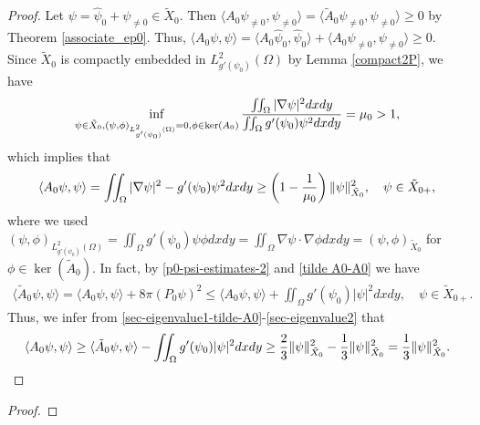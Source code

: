 \documentclass[1 [leqno, 11pt]{amsart}
\numberwithin{equation}{section}
\begin{document}
\begin{CJK*}{GBK}{song}
\begin{proof}
Let $\psi=\widehat\psi_0+\psi_{\neq0}\in \tilde X_0$. Then
$\langle A_0 \psi_{\neq0},\psi_{\neq0}\rangle =
\langle \tilde A_0 \psi_{\neq0},\psi_{\neq0}\rangle \geq 0$ by Theorem \ref{associate_ep0}.
Thus, $
\langle A_0\psi,\psi\rangle= \langle A_0\widehat\psi_0,\widehat\psi_0\rangle+\langle A_0\psi_{\neq0},\psi_{\neq0}\rangle\geq0$.
Since  $\tilde X_0$ is compactly embedded in $L^2_{g'(\psi_0)}(\Omega)$ by Lemma \ref{compact2P}, we have
\begin{align*}\inf_{\psi \in \tilde X_0, (\psi, \phi)_{L^2_{g'(\psi_0)}(\Omega)} = 0, \phi\in\ker(A_0)}{\iint_\Omega|\nabla\psi|^2dxdy\over\iint_\Omega g'(\psi_0)\psi^2dxdy}=\mu_0>1,
\end{align*}
which implies that
\begin{align*}
 \langle A_0\psi,\psi\rangle=\iint_\Omega|\nabla\psi|^2-g'(\psi_0)\psi^2dxdy\geq \left(1-{1\over\mu_0}\right) \| \psi\|_{\tilde X_0}^2,\quad \psi\in\tilde X_{0+},
\end{align*}
where we used  $(\psi,\phi)_{L^2_{g'(\psi_0)}(\Omega)}=\iint_{\Omega}g'(\psi_0)\psi\phi dxdy=\iint_{\Omega}\nabla\psi\cdot\nabla\phi dxdy=(\psi,\phi)_{\tilde X_0}$ for $\phi\in\ker (\tilde A_0)$.
 In fact, by \eqref{p0-psi-estimates-2} and \eqref{tilde A0-A0} we have
\begin{align*}
\langle\tilde  A_0 \psi,\psi\rangle=\langle A_0 \psi,\psi\rangle+8\pi(P_0 \psi)^2\leq\langle A_0 \psi,\psi\rangle+\iint_\Omega g'(\psi_0)|\psi|^2dxdy,\quad \psi\in\tilde X_{0+}.
\end{align*}
Thus, we infer from \eqref{sec-eigenvalue1-tilde-A0}-\eqref{sec-eigenvalue2} that
\begin{align*}
\langle A_0 \psi,\psi\rangle\geq
\langle\tilde  A_0 \psi,\psi\rangle-\iint_\Omega g'(\psi_0)|\psi|^2dxdy\geq {2\over3} \| \psi\|_{\tilde X_0}^2-{1\over3} \| \psi\|_{\tilde X_0}^2={1\over3} \| \psi\|_{\tilde X_0}^2.
\end{align*}
\fi
\end{proof}

\begin{proof}




\end{proof}
\end{CJK*}
\end{document}
